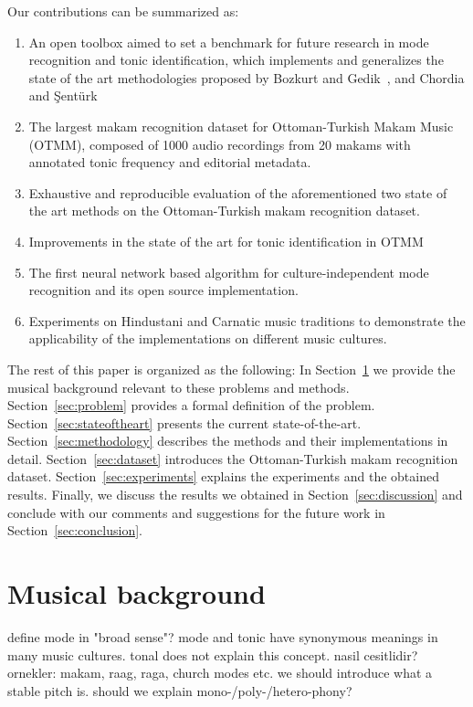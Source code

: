 \documentclass{sig-alternate}
\begin{document}
Our contributions can be summarized as:
\begin{enumerate}[noitemsep]
\item An open toolbox aimed to set a benchmark for future research in mode recognition and tonic identification, which implements and generalizes the state of the art methodologies propo\-sed by Bozkurt and Ge\-dik~\cite{bozkurt_tonic, bozkurt_makam}, and Chordia and \c{S}ent\"{u}rk~\cite{chordia}
\item The largest makam recognition dataset for Ottoman-Turkish Makam Music (OTMM), composed of 1000 audio recordings from 20 makams with annotated tonic frequency and editorial metadata.
\item Exhaustive and reproducible evaluation of the aforementioned two state of the art methods on the Otto\-man-Turkish makam recognition dataset.
\item Improvements in the state of the art for tonic identification in OTMM
\item The first neural network based algorithm for culture-independent mode recognition and its open source implementation. 
\item Experiments on Hindustani and Carnatic music traditions to demonstrate the applicability of the implementations on different music cultures.
\end{enumerate}
The rest of this paper is organized as the following: In Section~\ref{sec:music} we provide the musical background relevant to these problems and methods. Section~\ref{sec:problem} provides a formal definition of the problem. Section~\ref{sec:stateoftheart} presents the current state-of-the-art. Section~\ref{sec:methodology} describes the methods and their implementations in detail. Section~\ref{sec:dataset} introduces the Ottoman-Turkish makam recognition dataset. Section~\ref{sec:experiments} explains the experiments and the obtained results. Finally, we discuss the results we obtained in Section~\ref{sec:discussion} and conclude with our comments and suggestions for the future work in Section~\ref{sec:conclusion}.


\section{Musical background}\label{sec:music}

define mode in "broad sense"? mode and tonic have synonymous meanings in many music cultures. tonal does not explain this concept. nasil cesitlidir? ornekler: makam, raag, raga, church modes etc. we should introduce what a stable pitch is. should we explain mono-/poly-/hetero-phony?
\end{document}
